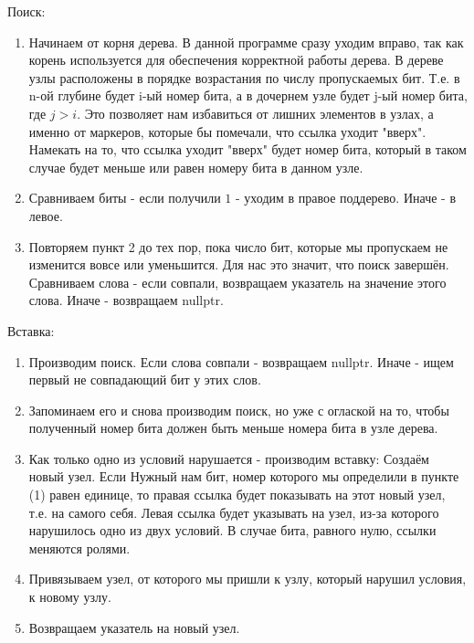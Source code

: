 \documentclass[12pt]{article}
\begin{document}
Поиск:
\begin{enumerate}
	\item Начинаем от корня дерева. В данной программе сразу уходим вправо, так как корень используется для обеспечения корректной работы дерева. В дереве узлы расположены в порядке возрастания по числу пропускаемых бит. Т.е. в n-ой глубине будет i-ый номер бита, а в дочернем узле будет j-ый номер бита, где $j > i$. Это позволяет нам избавиться от лишних элементов в узлах, а именно от маркеров, которые бы помечали, что ссылка уходит "вверх". Намекать на то, что ссылка уходит "вверх" будет номер бита, который в таком случае будет меньше или равен номеру бита в данном узле.
	\item Сравниваем биты - если получили $1$ - уходим в правое поддерево. Иначе - в левое.
	\item Повторяем пункт 2 до тех пор, пока число бит, которые мы пропускаем не изменится вовсе или уменьшится. Для нас это значит, что поиск завершён. Сравниваем слова - если совпали, возвращаем указатель на значение этого слова. Иначе - возвращаем nullptr.
\end{enumerate}

Вставка:
\begin{enumerate}
	\item Производим поиск. Если слова совпали - возвращаем nullptr. Иначе - ищем первый не совпадающий бит у этих слов.
	\item Запоминаем его и снова производим поиск, но уже с оглаской на то, чтобы полученный номер бита должен быть меньше номера бита в узле дерева.
	\item Как только одно из условий нарушается - производим вставку:
		\subitem Создаём новый узел. 
		\subitem Если Нужный нам бит, номер которого мы определили в пункте (1) равен единице, то правая ссылка будет показывать на этот новый узел, т.е. на самого себя. 
		\subitem Левая ссылка будет указывать на узел, из-за которого нарушилось одно из двух условий. 
		\subitem В случае бита, равного нулю, ссылки меняются ролями.
	\item Привязываем узел, от которого мы пришли к узлу, который нарушил условия, к новому узлу.
	\item Возвращаем указатель на новый узел.
\end{enumerate}
\end{document}
